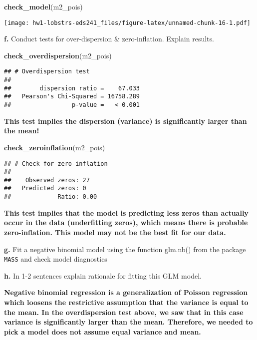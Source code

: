 \documentclass[
]{article}
\newenvironment{Shaded}{\begin{snugshade}}{\end{snugshade}}
\newcommand{\FunctionTok}[1]{\textcolor[rgb]{0.13,0.29,0.53}{\textbf{#1}}}
\newcommand{\NormalTok}[1]{#1}
\begin{document}
\begin{Shaded}
\begin{Highlighting}[]
\FunctionTok{check\_model}\NormalTok{(m2\_pois)}
\end{Highlighting}
\end{Shaded}

\texttt{[image: hw1-lobstrs-eds241\_files/figure-latex/unnamed-chunk-16-1.pdf]}

\textbf{f.} Conduct tests for over-dispersion \& zero-inflation. Explain
results.

\begin{Shaded}
\begin{Highlighting}[]
\FunctionTok{check\_overdispersion}\NormalTok{(m2\_pois)}
\end{Highlighting}
\end{Shaded}

\begin{verbatim}
## # Overdispersion test
## 
##        dispersion ratio =    67.033
##   Pearson's Chi-Squared = 16758.289
##                 p-value =   < 0.001
\end{verbatim}

\textbf{This test implies the dispersion (variance) is significantly
larger than the mean!}

\begin{Shaded}
\begin{Highlighting}[]
\FunctionTok{check\_zeroinflation}\NormalTok{(m2\_pois)}
\end{Highlighting}
\end{Shaded}

\begin{verbatim}
## # Check for zero-inflation
## 
##    Observed zeros: 27
##   Predicted zeros: 0
##             Ratio: 0.00
\end{verbatim}

\textbf{This test implies that the model is predicting less zeros than
actually occur in the data (underfitting zeros), which means there is
probable zero-inflation. This model may not be the best fit for our
data.}

\textbf{g.} Fit a negative binomial model using the function glm.nb()
from the package \texttt{MASS} and check model diagnostics

\textbf{h.} In 1-2 sentences explain rationale for fitting this GLM
model.

\textbf{Negative binomial regression is a generalization of Poisson
regression which loosens the restrictive assumption that the variance is
equal to the mean. In the overdispersion test above, we saw that in this
case variance is significantly larger than the mean. Therefore, we
needed to pick a model does not assume equal variance and mean.}
\end{document}
